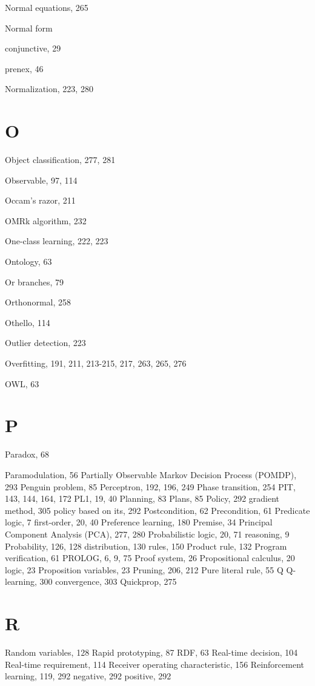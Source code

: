 \documentclass[10pt]{book}
\begin{document}
Normal equations, 265

Normal form

conjunctive, 29

prenex, 46

Normalization, 223, 280

\section{O}

Object classification, 277, 281

Observable, 97, 114

Occam's razor, 211

OMRk algorithm, 232

One-class learning, 222, 223

Ontology, 63

Or branches, 79

Orthonormal, 258

Othello, 114

Outlier detection, 223

Overfitting, 191, 211, 213-215, 217, 263, 265, 276

OWL, 63

\section{P}

Paradox, 68

Paramodulation, 56
Partially Observable Markov Decision Process (POMDP), 293
Penguin problem, 85
Perceptron, 192, 196, 249
Phase transition, 254
PIT, 143, 144, 164, 172
PL1, 19, 40
Planning, 83
Plans, 85
Policy, 292
gradient method, 305
policy based on its, 292
Postcondition, 62
Precondition, 61
Predicate logic, 7
first-order, 20, 40
Preference learning, 180
Premise, 34
Principal Component Analysis (PCA), 277, 280
Probabilistic
logic, 20, 71
reasoning, 9
Probability, 126, 128
distribution, 130
rules, 150
Product rule, 132
Program verification, 61
PROLOG, 6, 9, 75
Proof system, 26
Propositional
calculus, 20
logic, 23
Proposition variables, 23
Pruning, 206, 212
Pure literal rule, 55
Q
Q-learning, 300
convergence, 303
Quickprop, 275

\section{R}

Random variables, 128
Rapid prototyping, 87
RDF, 63
Real-time decision, 104
Real-time requirement, 114
Receiver operating characteristic, 156
Reinforcement
learning, 119, 292
negative, 292
positive, 292
\end{document}
